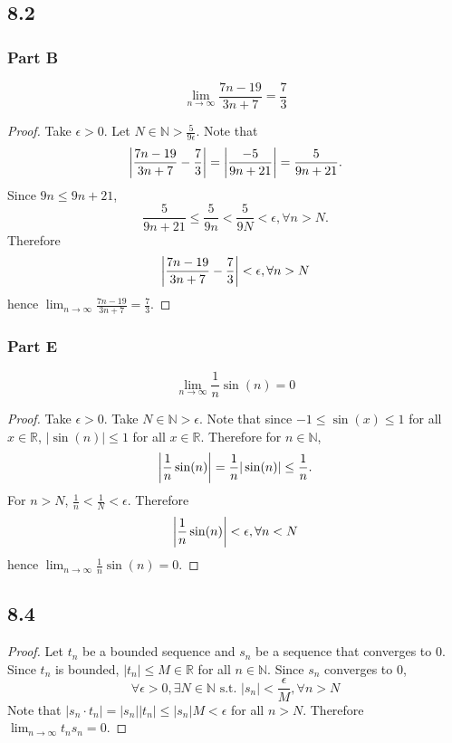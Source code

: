 \documentclass[12pt,titlepage]{extarticle}
\begin{document}
\subsection*{8.2}
\subsubsection*{Part B}
\[
    \lim_{n\to \infty} \frac{7n-19}{3n+7} = \frac{7}{3}
\]
\begin{proof}
    Take $\epsilon > 0$. Let $N \in \mathbb{N} > \frac{5}{9\epsilon}$. Note that
    \[
        \qty|\frac{7n-19}{3n+7} - \frac{7}{3}| = \qty|\frac{-5}{9n+21}| = \frac{5}{9n + 21}.
    \]
    Since $9n \leq 9n + 21$,
    \[
        \frac{5}{9n + 21} \leq \frac{5}{9n} < \frac{5}{9N} < \epsilon, \forall n > N.
    \]
    Therefore
    \[
        \qty|\frac{7n-19}{3n+7} - \frac{7}{3}| < \epsilon, \forall n > N
    \]
    hence $\lim_{n\to \infty}\frac{7n-19}{3n+7} = \frac{7}{3}$.
\end{proof}

\subsubsection*{Part E}
\[
    \lim_{n\to \infty} \frac{1}{n} \sin(n) = 0
\]
\begin{proof}
    Take $\epsilon > 0$. Take $N \in \mathbb{N} > \epsilon$. Note that since $-1 \leq \sin(x) \leq 1$ for all $x \in \mathbb{R}$, $|\sin(n)| \leq 1$ for all $x \in \mathbb{R}$. Therefore for $n \in \mathbb{N}$,
    \[
        \qty|\frac{1}{n} \sin(n)| = \frac{1}{n} |\sin(n)| \leq \frac{1}{n}
    .\]
    For $n > N$, $\frac{1}{n} < \frac{1}{N} < \epsilon$. Therefore
    \[
        \qty|\frac{1}{n} \sin(n)| < \epsilon, \forall n < N
    \]
    hence $\lim_{n\to \infty}\frac{1}{n} \sin(n) = 0$.
\end{proof}

\subsection*{8.4}
\begin{proof}
    Let $t_n$ be a bounded sequence and $s_n$ be a sequence that converges to $0$. Since $t_n$ is bounded, $|t_n| \leq M \in \mathbb{R}$ for all $n \in \mathbb{N}$. Since $s_n$ converges to $0$,
    \[
        \forall\epsilon > 0, \exists N \in \mathbb{N} \text{ s.t. } |s_n| < \frac{\epsilon}{M}, \forall n > N
    \]
    Note that $|s_n \cdot t_n| = |s_n| |t_n| \leq |s_n| M < \epsilon$ for all $n > N$. Therefore $\lim_{n\to \infty} t_n s_n = 0$.
\end{proof}
\end{document}
